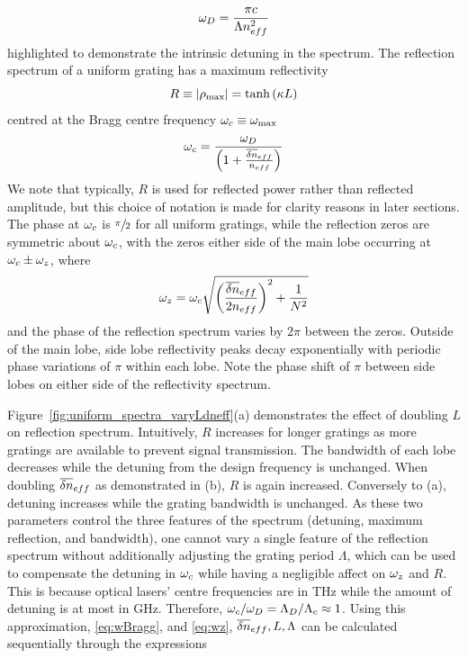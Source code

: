 %
\begin{equation}
    \omega_D = \frac{\pi c}{\Lambda n_{eff}^2}
\end{equation}
%
highlighted to demonstrate the intrinsic detuning in the spectrum. The reflection spectrum of a uniform grating has a maximum reflectivity 
%
\begin{equation}
\label{eq:rmax}
    R \equiv |\rho_\text{max}| = \tanh{(\kappa L)}
\end{equation}
%
centred at the Bragg centre frequency $\omega_c \equiv \omega_\text{max}$
%
\begin{equation}
\label{eq:wBragg}
    \omega_c = \frac{\omega_D}{\left( 1 + \frac{\overline{\delta n}_{eff} }{n_{eff}}\right)}
\end{equation}
%
We note that typically, $R$ is used for reflected power rather than reflected amplitude, but this choice of notation is made for clarity reasons in later sections. The phase at $\omega_c$ is $\sfrac{\pi}{2}$ for all uniform gratings, while the reflection zeros are symmetric about $\omega_c$, with the zeros either side of the main lobe occurring at $\omega_c \pm \omega_z$, where
%
\begin{equation}
\label{eq:wz}
    \omega_z = \omega_c \sqrt{\left( \frac{\overline{\delta n}_{eff}}{2 n_{eff}} \right)^2 + \frac{1}{N^2} }
\end{equation}
%
and the phase of the reflection spectrum varies by $2 \pi$ between the zeros. Outside of the main lobe, side lobe reflectivity peaks decay exponentially with periodic phase variations of $\pi$ within each lobe. Note the phase shift of $\pi$ between side lobes on either side of the reflectivity spectrum.
%
\par
%
Figure~\ref{fig:uniform_spectra_varyLdneff}(a) demonstrates the effect of doubling $L$ on reflection spectrum. Intuitively, $R$ increases for longer gratings as more gratings are available to prevent signal transmission. The bandwidth of each lobe decreases while the detuning from the design frequency is unchanged. When doubling $\overline{\delta n}_{eff}$ as demonstrated in (b), $R$ is again increased. Conversely to (a), detuning increases while the grating bandwidth is unchanged. As these two parameters control the three features of the spectrum (detuning, maximum reflection, and bandwidth), one cannot vary a single feature of the reflection spectrum without additionally adjusting the grating period $\Lambda$, which can be used to compensate the detuning in $\omega_c$ while having a negligible affect on $\omega_z$ and $R$. This is because optical lasers' centre frequencies are in THz while the amount of detuning is at most in GHz. Therefore, $\omega_c/\omega_D = \Lambda_D/\Lambda_c \approx 1$. Using this approximation, \eqref{eq:wBragg}, and \eqref{eq:wz}, $\overline{\delta n}_{eff}, L, \Lambda$ can be calculated sequentially through the expressions
